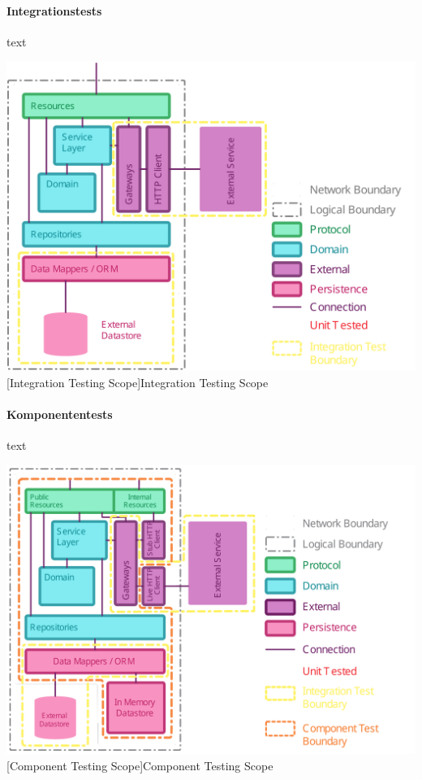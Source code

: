 \documentclass[12pt,a4paper,bibliography=totocnumbered,listof=totocnumbered]{scrartcl}
\begin{document}
\paragraph{Integrationstests}

text

\vspace{1em}
\begin{minipage}{\linewidth}
	\centering
	\includegraphics[width=0.9\linewidth]{images/img_integration-testing.pdf}
	[Integration Testing Scope]{Integration Testing Scope \cite{clemson}}
	\label{fig:img_integration-testing}
\end{minipage}

\paragraph{Komponententests}

text

\vspace{1em}
\begin{minipage}{\linewidth}
	\centering
	\includegraphics[width=0.9\linewidth]{images/img_component-testing.pdf}
	[Component Testing Scope]{Component Testing Scope \cite{clemson}}
	\label{fig:img_component-testing}
\end{minipage}
\end{document}
